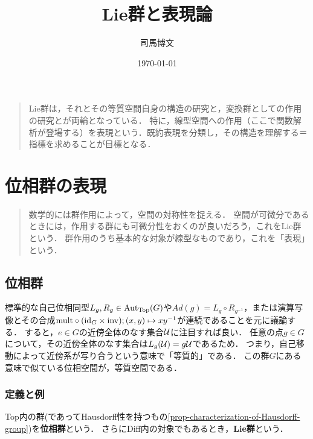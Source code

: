 \documentclass[uplatex,dvipdfmx]{jsreport}
\title{Lie群と表現論}
\author{司馬博文}
\date{\today}
\begin{document}
\tableofcontents

\begin{quotation}
    Lie群は，それとその等質空間自身の構造の研究と，変換群としての作用の研究とが両輪となっている．
    特に，線型空間への作用（ここで関数解析が登場する）を表現という．既約表現を分類し，その構造を理解する＝指標を求めることが目標となる．
\end{quotation}

\chapter{位相群の表現}

\begin{quotation}
    数学的には群作用によって，空間の対称性を捉える．
    空間が可微分であるときには，作用する群にも可微分性をおくのが良いだろう，これをLie群という．
    群作用のうち基本的な対象が線型なものであり，これを「表現」という．
\end{quotation}

\section{位相群}

\begin{tcolorbox}[colframe=ForestGreen, colback=ForestGreen!10!white,breakable,colbacktitle=ForestGreen!40!white,coltitle=black,fonttitle=\bfseries\sffamily,
title=]
    標準的な自己位相同型$L_g,R_g\in\mathrm{Aut}_{\mathrm{Top}}(G)$や$Ad(g)=L_g\circ R_{g^{-1}}$，または演算写像とその合成$\mathrm{mult}\circ(\mathrm{id}_G\times\mathrm{inv});(x,y)\mapsto xy^{-1}$が連続であることを元に議論する．
    すると，$e\in G$の近傍全体のなす集合$\mathcal{U}$に注目すれば良い．
    任意の点$g\in G$について，その近傍全体のなす集合は$L_g(\mathcal{U})=g\mathcal{U}$であるため．
    つまり，自己移動によって近傍系が写り合うという意味で「等質的」である．
    この群$G$にある意味で似ている位相空間が，等質空間である．
\end{tcolorbox}

\subsection{定義と例}

\begin{definition}
    Top内の群(であってHausdorff性を持つもの\ref{prop-characterization-of-Hausdorff-group})を\textbf{位相群}という．
    さらにDiff内の対象でもあるとき，\textbf{Lie群}という．
\end{definition}
\end{document}
